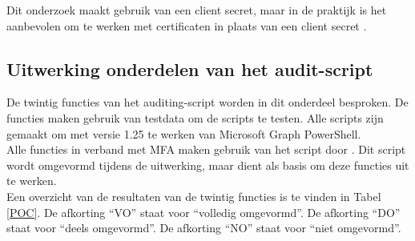 Dit onderzoek maakt gebruik van een client secret, maar in de praktijk is het aanbevolen om te werken met certificaten in plaats van een client secret \autocite{Terlisten2022}.

\subsection{Uitwerking onderdelen van het audit-script}


De twintig functies van het auditing-script worden in dit onderdeel besproken. De functies maken gebruik van testdata om de scripts te testen. Alle scripts zijn gemaakt om met versie 1.25 te werken van Microsoft Graph PowerShell. \\

Alle functies in verband met \ac{MFA} maken gebruik van het script door \textcite{Allen2023}. Dit script wordt omgevormd tijdens de uitwerking, maar dient als basis om deze functies uit te werken. \\

Een overzicht van de resultaten van de twintig functies is te vinden in Tabel \ref{POC}. De afkorting “VO” staat voor “volledig omgevormd”. De afkorting “DO” staat voor “deels omgevormd”. De afkorting “NO” staat voor “niet omgevormd”. 

